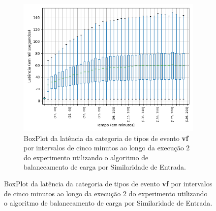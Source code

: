 

\begin{figure}
\centering
\begin{subfigure}{.5\textwidth}
\centering
\includegraphics[width=\textwidth]{figuras/graphics/boxplot_7-dez-is_vf.png}
\caption{BoxPlot da latência da categoria de tipos de evento \textbf{vf} por intervalos de cinco minutos ao longo da execução  2 do experimento utilizando o algoritmo de balanceamento de carga por Similaridade de Entrada.}
\label{fig:BoxPlot_vf_7-dez-is}
\end{subfigure}%


\end{figure}
